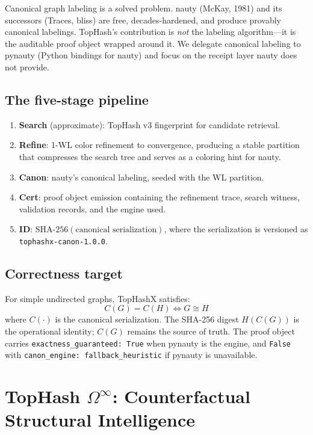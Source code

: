 \documentclass[11pt]{article}
\begin{document}
Canonical graph labeling is a solved problem. nauty (McKay, 1981) and its successors (Traces, bliss) are free, decades-hardened, and produce provably canonical labelings. TopHash's contribution is \emph{not} the labeling algorithm---it is the auditable proof object wrapped around it. We delegate canonical labeling to pynauty (Python bindings for nauty) and focus on the receipt layer nauty does not provide.

\subsection{The five-stage pipeline}

\begin{enumerate}
    \item \textbf{Search} (approximate): TopHash v3 fingerprint for candidate retrieval.
    \item \textbf{Refine}: 1-WL color refinement to convergence, producing a stable partition that compresses the search tree and serves as a coloring hint for nauty.
    \item \textbf{Canon}: nauty's canonical labeling, seeded with the WL partition.
    \item \textbf{Cert}: proof object emission containing the refinement trace, search witness, validation records, and the engine used.
    \item \textbf{ID}: $\text{SHA-256}(\text{canonical serialization})$, where the serialization is versioned as \texttt{tophashx-canon-1.0.0}.
\end{enumerate}

\subsection{Correctness target}

For simple undirected graphs, TopHashX satisfies:
\begin{equation}
C(G) = C(H) \iff G \cong H
\end{equation}
where $C(\cdot)$ is the canonical serialization. The SHA-256 digest $H(C(G))$ is the operational identity; $C(G)$ remains the source of truth. The proof object carries \texttt{exactness\_guaranteed: True} when pynauty is the engine, and \texttt{False} with \texttt{canon\_engine: fallback\_heuristic} if pynauty is unavailable.

\section{TopHash $\Omega^\infty$: Counterfactual Structural Intelligence}
\end{document}

